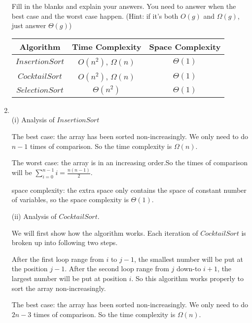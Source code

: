 \documentclass[12pt,a4paper]{article}
\makeatletter
\newtheorem*{solution}{Solution}
\theoremstyle{definition}
\renewenvironment{solution}[1][Solution] {\par\pushQED{\qed}\normalfont\topsep6\p@\@plus6\p@\relax\trivlist\item[\hskip\labelsep\bfseries#1\@addpunct{.}]\ignorespaces}{\popQED\endtrivlist\@endpefalse} \makeatother
\makeatother
\begin{document}
\begin{enumerate}
   
Fill in the blanks and explain your answers. You need to answer when the best case and the worst case happen. {\color{blue} (Hint: if it's both $O(g)$ and $\Omega(g)$, just answer $\Theta(g)$)}
\begin{table}[!h]

\label{Tab-compare}
	\centering
	\begin{tabular}{c|c| c }
		\toprule[2pt]
		\textbf{Algorithm} & \textbf{Time Complexity} & \textbf{Space Complexity} \\
		\hline
		\hline
		$InsertionSort$& $O(n^2)$, $\Omega(n)$  &  $\Theta(1)$  \\
		
		$CocktailSort$ &$O(n^2)$, $\Omega(n)$  & $\Theta(1)$ \\

		$SelectionSort$ &$\Theta(n^2)$  & $\Theta(1)$  \\
		\bottomrule[2pt]


	\end{tabular}
\end{table}
    \begin{solution}
    	~\\
     	(i) Analysis of $InsertionSort$
     	
     	The best case: the array has been sorted non-increasingly. We only need to do $n-1$ times of comparison. So the time complexity is $\Omega(n)$.
     	
     	The worst case: the array is in an increasing order.So the times of comparison will be $\sum_{i=0}^{n-1} i=\frac{n(n-1)}{2}$.
     	
     	space complexity: the extra space only contains the space of constant number of variables, so the space complexity is $\Theta(1)$.
     	
     	(ii) Analysis of $CocktailSort$.
     	
     	We will first show how the algorithm works. Each iteration of $CocktailSort$ is broken up
     	into following two steps.
     	
     	After the first loop range from $i$ to $j-1$, the smallest number will be put at the position $j-1$. After the second loop range from $j$ down-to $i+1$, the largest number will be put at position $i$. So this algorithm works properly to sort the array non-increasingly.
     	
     	The best case: the array has been sorted non-increasingly. We only need to do $2n-3$ times of comparison. So the time complexity is $\Omega(n)$.
     	

\end{solution}
\end{enumerate}
\end{document}
